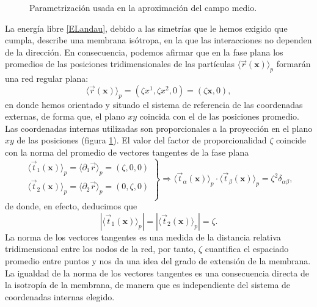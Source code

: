 \begin{figure}[h]
\centering
 \resizebox{\columnwidth}{!}{}
\caption{Parametrización usada en la aproximación del campo medio.}\label{campo-medio-fig}
\end{figure}

La energía libre \eqref{ELandau}, debido a las simetrías que le hemos exigido
que cumpla, describe una membrana isótropa, en la que las interacciones no
dependen de la dirección. En consecuencia, podemos afirmar que en la fase
plana los promedios de las posiciones tridimensionales de las partículas
$\langle\vec{r}(\mathbf{x})\rangle_{p}$ formarán una red regular plana:  
\begin{equation*}
 \langle\vec{r}(\mathbf{x})\rangle_{p}=(\zeta x^1,\zeta x^2,0)=(\zeta \mathbf{x},0), 
\end{equation*}
en donde hemos orientado y situado el sistema de referencia de las coordenadas
externas, de forma que, el plano $xy$ coincida con el de las
posiciones promedio. Las coordenadas internas utilizadas son 
proporcionales a la proyección en el plano $xy$ de las posiciones (figura
\ref{campo-medio-fig}). El valor del factor de proporcionalidad $\zeta$
coincide con la norma del promedio de vectores tangentes de la fase plana
\begin{equation}
 \left.\begin{array}{c}
\langle\vec{t}_{1}(\mathbf{x})\rangle_{p}=\langle\partial_1\vec{r}\rangle_{p}=(\zeta ,0,0)\\
\langle\vec{t}_{2}(\mathbf{x})\rangle_{p}=\langle\partial_2\vec{r}\rangle_{p}=(0,\zeta ,0)\\
 \end{array}\right\}\Rightarrow
\langle\vec{t}_{\alpha}(\mathbf{x})\rangle_{p}\cdot\langle\vec{t}_{\beta}(\mathbf{x})\rangle_{p}=\zeta^2 \delta_{\alpha\beta},
\end{equation}
de donde, en efecto, deducimos que
\begin{equation*}
|\langle\vec{t}_1(\mathbf{x})\rangle_{p}|=|\langle\vec{t}_2(\mathbf{x})\rangle_{p}|=\zeta.
\end{equation*}
La norma de los vectores tangentes es una medida de la distancia relativa
tridimensional entre los nodos de la red, por tanto, $\zeta$ cuantifica el
espaciado promedio entre puntos y nos da una idea del grado de extensión de la
membrana. La igualdad de la norma de los vectores tangentes es una consecuencia
directa de la isotropía de la membrana, de manera que es independiente del
sistema de coordenadas internas elegido.


